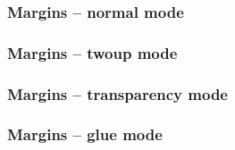\subsubsection{Margins -- normal mode}


\subsubsection{Margins -- twoup mode}


\subsubsection{Margins -- transparency mode}


\subsubsection{Margins -- glue mode}


